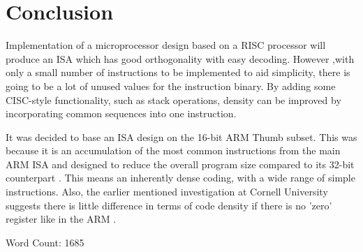 \documentclass[12pt,a4paper]{article}
\begin{document}
\section{Conclusion}
Implementation of a microprocessor design based on a RISC processor will produce an ISA which has good orthogonality with easy decoding. However ,with only a small number of instructions to be implemented to aid simplicity, there is going to be a lot of unused values for the instruction binary. By adding some CISC-style functionality, such as stack operations, density can be improved by incorporating common sequences into one instruction.

It was decided to base an ISA design on the 16-bit ARM Thumb subset. This was because it is an accumulation of the most common instructions from the main ARM ISA and designed to reduce the overall program size compared to its 32-bit counterpart \cite{ARM:ARM11RefMan}. This means an inherently dense coding, with a wide range of simple instructions. Also, the earlier mentioned investigation at Cornell University suggests there is little difference in terms of code density if there is no 'zero' register like in the ARM \cite{Density:Correlation}.


Word Count: 1685%




%
%


\end{document}
